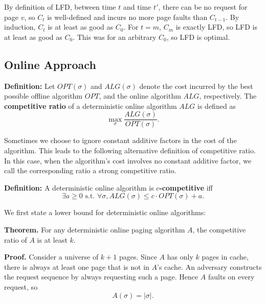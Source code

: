 \documentclass[14pt]{extreport}
\begin{document}
    \vspace{2mm}
    By definition of LFD, between time \( t \) and time \( t' \), there can be no request for page \( v \), so \( C_t \) is well-defined and incurs no more page faults than \( C_{t-1} \). By induction, \( C_t \) is at least as good as \( C_0 \). For \( t = m \), \( C_m \) is exactly LFD, so LFD is at least as good as \( C_0 \). This was for an arbitrary \( C_0 \), so LFD is optimal.


\subsection*{Online Approach}

    \begin{tcolorbox}[colframe=gray!50, sharp corners]
        \textbf{Definition:} Let $OPT(\sigma)$ and $ALG(\sigma)$ denote the cost incurred by the best possible offline algorithm $OPT$, and the online algorithm $ALG$, respectively. The \textbf{competitive ratio} of a deterministic online algorithm $ALG$ is defined as
        $$\max_{\sigma}\frac{ALG(\sigma)}{OPT(\sigma)}.$$
    \end{tcolorbox}
    
    Sometimes we choose to ignore constant additive factors in the cost of the algorithm. This leads to the following alternative definition of competitive ratio. In this case, when the algorithm's cost involves no constant additive factor, we call the corresponding ratio a strong competitive ratio.

    \begin{tcolorbox}[colframe=gray!50, sharp corners]
        \textbf{Definition:} A deterministic online algorithm is \textbf{$c$-competitive} iff
        $$\exists a \ge 0 \text{ s.t. } \forall \sigma, ALG(\sigma) \le c \cdot OPT(\sigma) + a.$$
    \end{tcolorbox}

    We first state a lower bound for deterministic online algorithms:

    \vspace{5mm}
    \textbf{Theorem.} For any deterministic online paging algorithm $A$, the competitive ratio of $A$ is at least $k$.

    \vspace{5mm}
    \textbf{Proof.}
    Consider a universe of $k + 1$ pages. Since $A$ has only $k$ pages in cache, there is always at least one page that is not in $A$'s cache. An adversary constructs the request sequence by always requesting such a page. Hence $A$ faults on every request, so
    $$A(\sigma) = |\sigma|.$$
\end{document}
